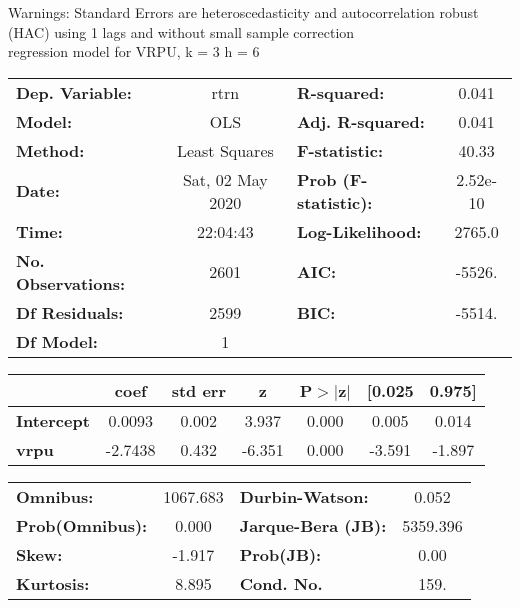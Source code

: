 Warnings: \newline
 [1] Standard Errors are heteroscedasticity and autocorrelation robust (HAC) using 1 lags and without small sample correction\\ 

regression model for VRPU, k = 3 h = 6\begin{center}
\begin{tabular}{lclc}
\toprule
\textbf{Dep. Variable:}    &       rtrn       & \textbf{  R-squared:         } &     0.041   \\
\textbf{Model:}            &       OLS        & \textbf{  Adj. R-squared:    } &     0.041   \\
\textbf{Method:}           &  Least Squares   & \textbf{  F-statistic:       } &     40.33   \\
\textbf{Date:}             & Sat, 02 May 2020 & \textbf{  Prob (F-statistic):} &  2.52e-10   \\
\textbf{Time:}             &     22:04:43     & \textbf{  Log-Likelihood:    } &    2765.0   \\
\textbf{No. Observations:} &        2601      & \textbf{  AIC:               } &    -5526.   \\
\textbf{Df Residuals:}     &        2599      & \textbf{  BIC:               } &    -5514.   \\
\textbf{Df Model:}         &           1      & \textbf{                     } &             \\
\bottomrule
\end{tabular}
\begin{tabular}{lcccccc}
                   & \textbf{coef} & \textbf{std err} & \textbf{z} & \textbf{P$> |$z$|$} & \textbf{[0.025} & \textbf{0.975]}  \\
\midrule
\textbf{Intercept} &       0.0093  &        0.002     &     3.937  &         0.000        &        0.005    &        0.014     \\
\textbf{vrpu}      &      -2.7438  &        0.432     &    -6.351  &         0.000        &       -3.591    &       -1.897     \\
\bottomrule
\end{tabular}
\begin{tabular}{lclc}
\textbf{Omnibus:}       & 1067.683 & \textbf{  Durbin-Watson:     } &    0.052  \\
\textbf{Prob(Omnibus):} &   0.000  & \textbf{  Jarque-Bera (JB):  } & 5359.396  \\
\textbf{Skew:}          &  -1.917  & \textbf{  Prob(JB):          } &     0.00  \\
\textbf{Kurtosis:}      &   8.895  & \textbf{  Cond. No.          } &     159.  \\
\bottomrule
\end{tabular}
\end{center}

